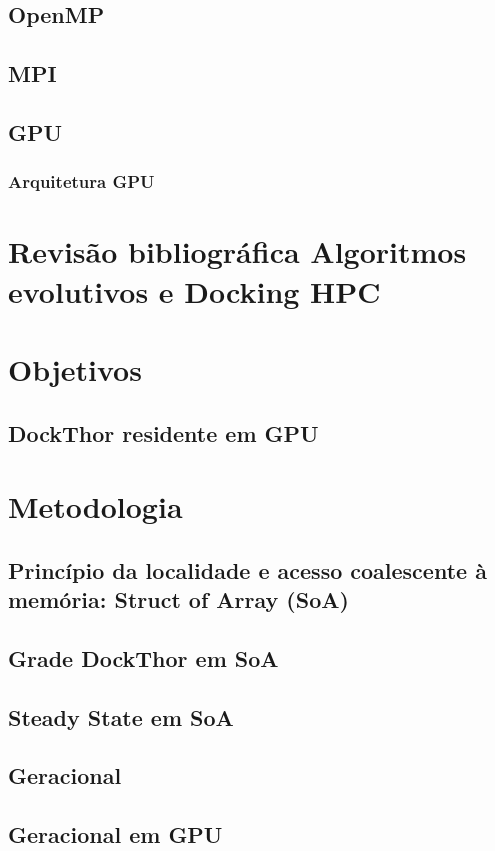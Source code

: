\section{OpenMP}
\section{MPI}
\section{GPU}
\subsection{Arquitetura GPU}


\chapter{Revisão bibliográfica Algoritmos evolutivos e Docking HPC}

\chapter{Objetivos}
\section{DockThor residente em GPU}

\chapter{Metodologia}
\section{Princípio da localidade e acesso coalescente à memória: Struct of Array (SoA)}
\section{Grade DockThor em SoA}
\section{Steady State em SoA}
\section{Geracional}
\section{Geracional em GPU}

